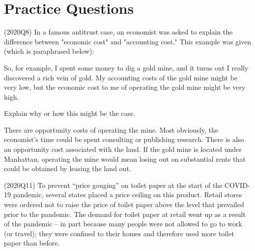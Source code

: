 \documentclass{exam}
\begin{document}
\section{Practice Questions}

\begin{questions}

\question (2020Q8) In a famous antitrust case, an economist was asked to explain the difference between "economic cost" and "accounting cost." This example was given (which is paraphrased below):

\begin{blockquote}
So, for example, I spent some money to dig a gold mine, and it turns out I really discovered a rich vein of gold. My accounting costs of the gold mine might be very low, but the economic cost to me of operating the gold mine might be very high.
\end{blockquote}

Explain why or how this might be the case. 

\begin{solution}
There are opportunity costs of operating the mine. Most obviously, the economist's time could be spent consulting or publishing research. There is also an opportunity cost associated with the land. If the gold mine is located under Manhattan, operating the mine would mean losing out on substantial rents that could be obtained by leasing the land out.
\end{solution}

\question (2020Q11) To prevent “price gouging” on toilet paper at the start of the COVID-19 pandemic, several states placed a price ceiling on this product. Retail stores were ordered not to raise the price of toilet paper above the level that prevailed prior to the pandemic. The demand for toilet paper at retail went up as a result of the pandemic – in part because many people were not allowed to go to work (or travel); they were confined to their homes and therefore used more toilet paper than before.

\end{questions}
\end{document}
